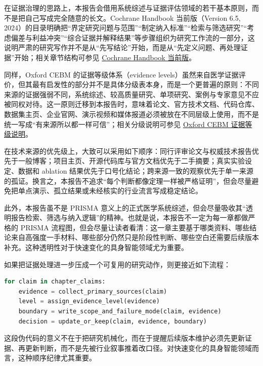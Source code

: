 在证据治理的思路上，本报告会借用系统综述与证据评估领域的若干基本原则，而不是把自己写成完全随意的长文。Cochrane Handbook 当前版（Version 6.5, 2024）的目录明确把“界定研究问题与范围”“制定纳入标准”“检索与筛选研究”“考虑偏差与利益冲突”“综合证据并解释结果”等步骤组织为研究工作流的一部分，这说明严肃的研究写作并不是从“先写结论”开始，而是从“先定义问题、再处理证据”开始；相关章节结构可参见 \href{https://www.cochrane.org/authors/handbooks-and-manuals/handbook/current}{Cochrane Handbook 当前版}。

同样，Oxford CEBM 的证据等级体系（evidence levels）虽然来自医学证据评价，但其最有启发性的部分并不是具体分级表本身，而是一个更普遍的原则：不同来源的证据强弱不同，系统综述、较高质量研究、单项研究、案例与专家意见不应被同权对待。这一原则迁移到本报告时，意味着论文、官方技术文档、代码仓库、数据集主页、企业官网、演示视频和媒体报道必须被放在不同层级上使用，而不是统一写成“有来源所以都一样可信”；相关分级说明可参见 \href{https://www.cebm.ox.ac.uk/resources/levels-of-evidence/oxford-centre-for-evidence-based-medicine-levels-of-evidence-march-2009}{Oxford CEBM 证据等级说明}。

在技术来源的优先级上，大致可以采用如下顺序：同行评审论文与权威技术报告优先于一般博客；项目主页、开源代码库与官方文档优先于二手摘要；真实实验设定、数据和 ablation 结果优先于口号化结论；跨来源一致的观察优先于单一来源的孤证。换言之，本报告不追求“每个判断都像定理一样被严格证明”，但会尽量避免把单点演示、孤立结果或未经核实的行业流言写成稳定结论。

此外，本报告虽不是 PRISMA 意义上的正式医学系统综述，但会尽量吸收其“透明报告检索、筛选与纳入逻辑”的精神。也就是说，本报告不一定为每一章都做严格的 PRISMA 流程图，但会尽量让读者看清：这一章主要基于哪类资料、哪些结论来自高强度一手材料、哪些部分仍然只是阶段性判断、哪些空白还需要后续版本补充。这种透明性对于快速变化的具身智能领域尤为重要。

如果把证据处理进一步压成一个可复用的研究动作，则更接近如下流程：

\begin{lstlisting}[language=python]
for claim in chapter_claims:
    evidence = collect_primary_sources(claim)
    level = assign_evidence_level(evidence)
    boundary = write_scope_and_failure_mode(claim, evidence)
    decision = update_or_keep(claim, evidence, boundary)
\end{lstlisting}

这段伪代码的意义不在于把研究机械化，而在于提醒后续版本维护必须先更新证据、再更新判断，而不是先被行业叙事推着改口径。对快速变化的具身智能领域而言，这种顺序纪律尤其重要。

